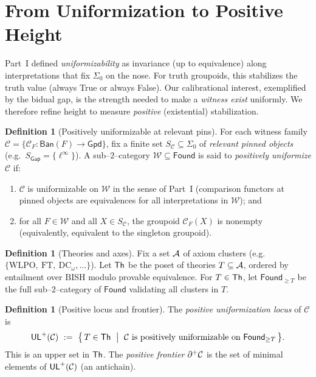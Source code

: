 \documentclass[11pt]{article}
\theoremstyle{definition}
\newtheorem{definition}[theorem]{Definition}
\theoremstyle{remark}
\newcommand{\linf}{\ell^\infty}
\newcommand{\WLPO}{\mathrm{WLPO}}
\newcommand{\BISH}{\mathrm{BISH}}
\newcommand{\Found}{\mathsf{Found}}
\newcommand{\Ban}{\mathsf{Ban}}
\newcommand{\Gpd}{\mathsf{Gpd}}
\newcommand{\SigmaZero}{\Sigma_{0}}
\begin{document}
\section{From Uniformization to Positive Height}\label{p2:sec:positive-height}

Part~I defined \emph{uniformizability} as invariance (up to equivalence) along interpretations that fix \(\SigmaZero\) on the nose. For truth groupoids, this stabilizes the truth value (always True or always False). Our calibrational interest, exemplified by the bidual gap, is the strength needed to make a \emph{witness exist} uniformly. We therefore refine height to measure \emph{positive} (existential) stabilization.

\begin{definition}[Positively uniformizable at relevant pins]\label{p2:def:pos-unif}
For each witness family \(\mathcal C=\{\mathcal C_F:\Ban(F)\to\Gpd\}\), fix a finite set
\(S_{\mathcal C}\subseteq\SigmaZero\) of \emph{relevant pinned objects}
(e.g.\ \(S_{\mathsf{Gap}}=\{\linf\}\)).
A sub--$2$--category \(\mathcal W\subseteq\Found\) is said to \emph{positively uniformize} \(\mathcal C\) if:
\begin{enumerate}
\item \(\mathcal C\) is uniformizable on \(\mathcal W\) in the sense of Part~I (comparison functors at pinned objects are equivalences for all interpretations in \(\mathcal W\)); and
\item for all \(F\in\mathcal W\) and all \(X\in S_{\mathcal C}\), the groupoid \(\mathcal C_F(X)\) is nonempty (equivalently, equivalent to the singleton groupoid).
\end{enumerate}
\end{definition}

\begin{definition}[Theories and axes]\label{p2:def:theories-axes}
Fix a set \(\mathcal{A}\) of axiom clusters (e.g.\ \(\{\WLPO,\ \mathrm{FT},\ \mathrm{DC}_\omega,\ldots\}\)).
Let \(\mathsf{Th}\) be the poset of theories \(T\subseteq\mathcal{A}\), ordered by entailment over \(\BISH\) modulo provable equivalence. For \(T\in\mathsf{Th}\), let \(\Found_{\ge T}\) be the full sub--$2$--category of \(\Found\) validating all clusters in \(T\).
\end{definition}

\begin{definition}[Positive locus and frontier]\label{p2:def:ULpos-frontier}
The \emph{positive uniformization locus} of \(\mathcal C\) is
\[
  \ULpos(\mathcal C)\ :=\ \bigl\{\,T\in\Th\ \bigm|\ \mathcal C
  \text{ is positively uniformizable on }\Found_{\ge T}\,\bigr\}.
\]
This is an upper set in \(\mathsf{Th}\). The \emph{positive frontier} \(\partial^{+}\mathcal C\) is the set of minimal elements of \(\mathsf{UL}^{+}(\mathcal C)\) (an antichain).
\end{definition}
\end{document}
